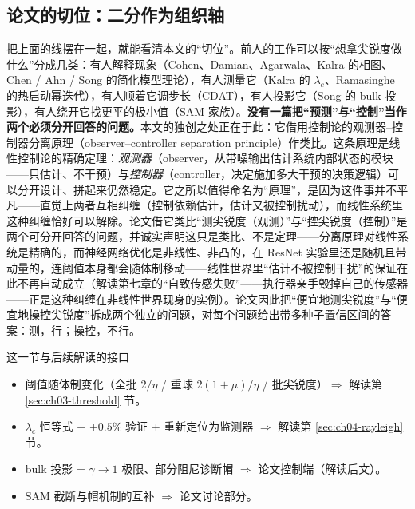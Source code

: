 \subsection{论文的切位：二分作为组织轴}
\label{sec:ch02-position}

把上面的线摆在一起，就能看清本文的“切位”。前人的工作可以按“想拿尖锐度做什么”分成几类：有人解释现象（Cohen、Damian、Agarwala、Kalra
的相图、Chen / Ahn / Song 的简化模型理论），有人测量它（Kalra 的
$\lambda_c$、Ramasinghe 的热启动幂迭代），有人顺着它调步长（CDAT），有人投影它（Song
的 bulk 投影），有人绕开它找更平的极小值（SAM
家族）。\textbf{没有一篇把“预测”与“控制”当作两个必须分开回答的问题。}本文的独创之处正在于此：它借用控制论的观测器--控制器分离原理（observer--controller separation principle）作类比。这条原理是线性控制论的精确定理：\emph{观测器}（observer，从带噪输出估计系统内部状态的模块——只估计、不干预）与\emph{控制器}（controller，决定施加多大干预的决策逻辑）可以分开设计、拼起来仍然稳定。它之所以值得命名为“原理”，是因为这件事并不平凡——直觉上两者互相纠缠（控制依赖估计，估计又被控制扰动），而线性系统里这种纠缠恰好可以解除。论文借它类比“测尖锐度（观测）”与“控尖锐度（控制）”是两个可分开回答的问题，并诚实声明这只是类比、不是定理——分离原理对线性系统是精确的，而神经网络优化是非线性、非凸的，在
ResNet
实验里还是随机且带动量的，连阈值本身都会随体制移动——线性世界里``估计不被控制干扰''的保证在此不再自动成立（解读第七章的“自致传感失败”——执行器亲手毁掉自己的传感器——正是这种纠缠在非线性世界现身的实例）。论文因此把“便宜地测尖锐度”与“便宜地操控尖锐度”拆成两个独立的问题，对每个问题给出带多种子置信区间的答案：测，行；操控，不行。

\begin{keybox}{这一节与后续解读的接口}
\begin{itemize}
  \item 阈值随体制变化（全批 $2/\eta$ / 重球 $2(1{+}\mu)/\eta$ / 批尖锐度）$\Rightarrow$ 解读第 \ref{sec:ch03-threshold} 节。
  \item $\lambda_c$ 恒等式 + $\pm0.5\%$ 验证 + 重新定位为监测器 $\Rightarrow$ 解读第 \ref{sec:ch04-rayleigh} 节。
  \item bulk 投影 = $\gamma\to1$ 极限、部分阻尼诊断帽 $\Rightarrow$ 论文控制端（解读后文）。
  \item SAM 截断与帽机制的互补 $\Rightarrow$ 论文讨论部分。
\end{itemize}
\end{keybox}

